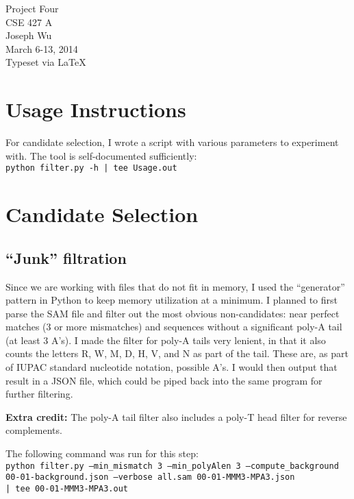 \documentclass[a4paper, 12pt]{report}
\begin{document}
    \begin{center}
        {\LARGE Project Four} \\
        CSE 427 A \\
        Joseph Wu  \\
        March 6-13, 2014 \\
        {\tiny Typeset via \LaTeX}
    \end{center}
    
\section{Usage Instructions}
    For candidate selection, I wrote a script with various parameters to experiment with.  
    The tool is self-documented sufficiently: \\
    \texttt{python filter.py -h | tee Usage.out}
    
    
\section{Candidate Selection}
    \subsection{``Junk'' filtration}
        Since we are working with files that do not fit in memory, 
            I used the ``generator'' pattern in Python to keep memory utilization at a minimum.
        I planned to first parse the SAM file and filter out the most obvious non-candidates:
            near perfect matches (3 or more mismatches) 
            and sequences without a significant poly-A tail (at least 3 A's). 
        I made the filter for poly-A tails very lenient, 
            in that it also counts the letters R, W, M, D, H, V, and N
            as part of the tail.  
        These are, as part of IUPAC standard nucleotide notation, possible A's.
        I would then output that result in a JSON file, 
            which could be piped back into the same program for further filtering.
            
        \textbf{Extra credit:} The poly-A tail filter also includes a poly-T head filter for reverse complements.
            
        The following command was run for this step: \\
        \texttt{python filter.py --min\_mismatch 3 --min\_polyAlen 3 --compute\_background \\
                00-01-background.json --verbose all.sam 00-01-MMM3-MPA3.json \\
                | tee 00-01-MMM3-MPA3.out}
        
\end{document}
